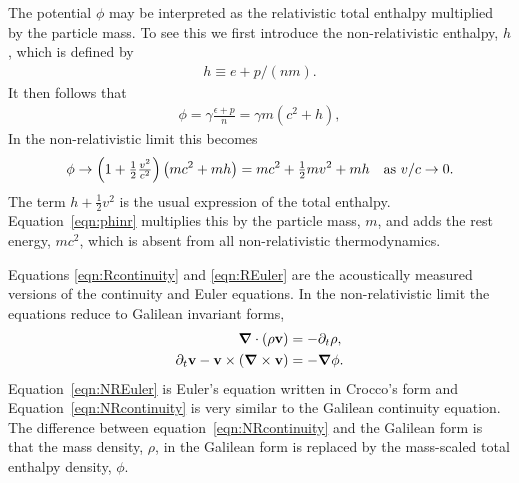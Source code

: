 \documentclass[10pt, fleqn,final,showtrims,oldfontcommands, article,a4paper,oneside]{memoir} %
\newcommand{\sub}[1]{\begin{subequations}#1\end{subequations}}
\newcommand{\eqnref}[1]{\ref{eqn:#1}}
\newcommand{\lr}[1]{\left( #1 \right)}
\renewcommand{\d}{\partial}
\newcommand{\del}{\nabla}
\newcommand{\vdel}{ \mbox{\boldmath $\del$}}
\newcommand{\dt}{{\d_t}}
\newcommand{\half}{\tfrac{1}{2}}
\newcommand{\vA}{\textbf{A}}
\newcommand{\vv}{\textbf{v}}
\begin{document}
The potential $\phi$ may be  interpreted as the relativistic  total enthalpy multiplied by the particle mass.
To see this we first introduce the non-relativistic enthalpy, $h$, which is defined by
\begin{align}
  h \equiv e + p/(nm).
\end{align}
It then follows that 
\begin{align}
  \phi =   \gamma\frac{\epsilon + p }{n} = \gamma m\lr{c^2 + h},
\end{align}
In the  non-relativistic limit this becomes
\begin{align}
  \phi \rightarrow \lr{1+\tfrac{1}{2}\tfrac{v^2}{c^2}} \lr{mc^2 + mh} = mc^2 + \tfrac{1}{2}m v^2 + mh \text{\quad as ${v/c\rightarrow 0.}$}
  \label{eqn:phinr}
\end{align}
The term $h + \half v^2$ is the usual expression of the total enthalpy.
Equation~\ref{eqn:phinr} multiplies this by the particle mass, $m$, and adds the rest energy, $mc^2$, 
which is absent from all non-relativistic thermodynamics.




Equations \eqnref{Rcontinuity} and \eqnref{REuler} are the acoustically measured versions of the continuity and Euler equations.
In the non-relativistic limit the equations reduce to Galilean invariant forms, 
\sub{
\begin{align}
  \vdel\cdot\lr{\rho \vv}  &= -\dt \rho, \label{eqn:NRcontinuity}\\
  \dt \vv - \vv\times \lr{\vdel\times \vv} &= - \vdel \phi.\label{eqn:NREuler}
\end{align}
}
Equation~\eqnref{NREuler} is Euler's equation written in Crocco's form\cite{Howe1998}
and Equation~\eqnref{NRcontinuity} is very similar to the Galilean continuity equation.
The difference between  equation~\ref{eqn:NRcontinuity}
and the Galilean form is that the mass density, $\rho$, in the Galilean form is
replaced by the mass-scaled total enthalpy density, $\phi$. 
\end{document}
